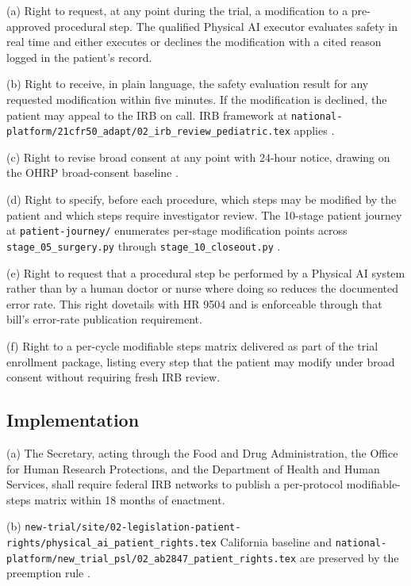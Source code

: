\hspace{0.5cm} (a) Right to request, at any point during the trial, a modification
to a pre-approved procedural step. The qualified Physical AI executor
evaluates safety in real time and either executes or declines the
modification with a cited reason logged in the patient's record.

(b) Right to receive, in plain language, the safety evaluation
result for any requested modification within five minutes. If the
modification is declined, the patient may appeal to the IRB on call. IRB framework at
\texttt{national-platform/21cfr50\_adapt/02\_irb\_review\_pediatric.tex}
applies \cite{kawchak_2026_19040707}.

(c) Right to revise broad consent at any point with 24-hour notice,
drawing on the OHRP broad-consent baseline
\cite{ohrp_broad_consent_attachment_c_2017}.

(d) Right to specify, before each procedure, which steps may be
modified by the patient and which steps require investigator review.
The 10-stage patient journey at \texttt{patient-journey/} enumerates per-stage modification points across
\texttt{stage\_05\_surgery.py} through
\texttt{stage\_10\_closeout.py} \cite{kawchak_2026_19119939}.

(e) Right to request that a procedural step be performed by a
Physical AI system rather than by a human doctor or nurse where doing
so reduces the documented error rate. This right dovetails with HR
9504 and is enforceable through that bill's error-rate publication
requirement.

(f) Right to a per-cycle modifiable steps matrix delivered as part
of the trial enrollment package, listing every step that the patient
may modify under broad consent without requiring fresh IRB review.

\subsection{Implementation}

\hspace{0.5cm} (a) The Secretary, acting through the Food and Drug Administration,
the Office for Human Research Protections, and the Department of
Health and Human Services, shall require federal IRB networks to
publish a per-protocol modifiable-steps matrix within 18 months of
enactment.

(b) \texttt{new-trial/site/02-legislation-patient-rights/physical\_ai\_patient\_rights.tex} California baseline
and
\texttt{national-platform/new\_trial\_psl/02\_ab2847\_patient\_rights.tex}
are preserved by the preemption rule \cite{kawchak_2026_19176370}.


